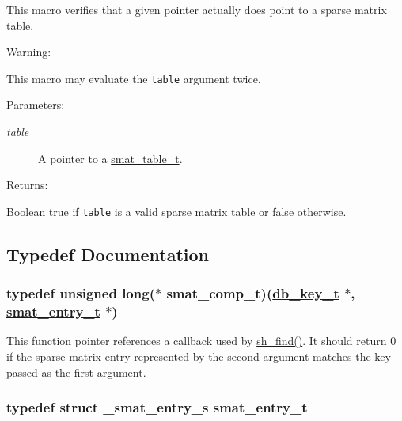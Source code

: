 This macro verifies that a given pointer actually does point to a sparse matrix table.

\begin{Desc}
\item[Warning: ]\par
This macro may evaluate the {\tt table} argument twice.\end{Desc}
\begin{Desc}
\item[Parameters: ]\par
\begin{description}
\item[{\em 
table}]A pointer to a \hyperlink{group__dbprim__smat_a0}{smat\_\-table\_\-t}.\end{description}
\end{Desc}
\begin{Desc}
\item[Returns: ]\par
Boolean true if {\tt table} is a valid sparse matrix table or false otherwise. \end{Desc}


\subsection{Typedef Documentation}
\hypertarget{group__dbprim__smat_a5}{
\subsubsection[smat\_\-comp\_\-t]{\setlength{\rightskip}{0pt plus 5cm}typedef unsigned long($\ast$ smat\_\-comp\_\-t)(\hyperlink{group__dbprim_a0}{db\_\-key\_\-t} $\ast$, \hyperlink{group__dbprim__smat_a2}{smat\_\-entry\_\-t} $\ast$)}}
\label{group__dbprim__smat_a5}


This function pointer references a callback used by \hyperlink{group__dbprim__smat_a19}{sh\_\-find()}. It should return 0 if the sparse matrix entry represented by the second argument matches the key passed as the first argument. \hypertarget{group__dbprim__smat_a2}{
\subsubsection[smat\_\-entry\_\-t]{\setlength{\rightskip}{0pt plus 5cm}typedef struct \_\-smat\_\-entry\_\-s smat\_\-entry\_\-t}}
\label{group__dbprim__smat_a2}


